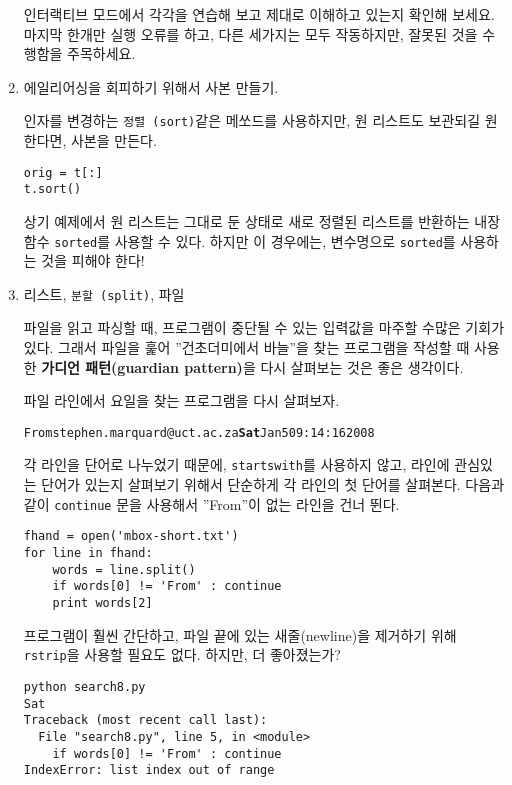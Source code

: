 \begin{enumerate}
인터랙티브 모드에서 각각을 연습해 보고 제대로 이해하고 있는지 확인해 보세요.
마지막 한개만 실행 오류를 하고, 다른 세가지는 모두 작동하지만, 잘못된 것을 수행함을 주목하세요.

\item 에일리어싱을 회피하기 위해서 사본 만들기.


인자를 변경하는 {\tt 정렬 (sort)}같은 메쏘드를 사용하지만, 원 리스트도 보관되길 원한다면, 사본을 만든다.

\beforeverb
\begin{verbatim}
orig = t[:]
t.sort()
\end{verbatim}
\afterverb

상기 예제에서 원 리스트는 그대로 둔 상태로 새로 정렬된 리스트를 반환하는 내장함수 {\tt sorted}를 사용할 수 있다.
하지만 이 경우에는, 변수명으로 {\tt sorted}를 사용하는 것을 피해야 한다!


\item 리스트, {\tt 분할 (split)}, 파일

파일을 읽고 파싱할 때, 프로그램이 중단될 수 있는 입력값을 마주할 수많은 기회가 있다.
그래서 파일을 훑어 ''건초더미에서 바늘''을 찾는 프로그램을 작성할 때 사용한 {\bf 가디언 패턴(guardian pattern)}을 다시 살펴보는 것은 좋은 생각이다.

파일 라인에서 요일을 찾는 프로그램을 다시 살펴보자.

\beforeverb
\begin{alltt}
From stephen.marquard@uct.ac.za {\bf Sat} Jan  5 09:14:16 2008
\end{alltt}
\afterverb

각 라인을 단어로 나누었기 때문에, {\tt startswith}를 사용하지 않고, 라인에 관심있는 단어가 있는지 살펴보기 위해서 단순하게 각 라인의 첫 단어를 살펴본다.
다음과 같이 {\tt continue} 문을 사용해서 ''From''이 없는 라인을 건너 뛴다. 

\beforeverb
\begin{verbatim}
fhand = open('mbox-short.txt')
for line in fhand:
    words = line.split()
    if words[0] != 'From' : continue
    print words[2]
\end{verbatim}
\afterverb
%

프로그램이 훨씬 간단하고, 파일 끝에 있는 새줄(newline)을 제거하기 위해 {\tt rstrip}을 사용할 필요도 없다.
하지만, 더 좋아졌는가?

\beforeverb
\begin{verbatim}
python search8.py 
Sat
Traceback (most recent call last):
  File "search8.py", line 5, in <module>
    if words[0] != 'From' : continue
IndexError: list index out of range
\end{verbatim}
\afterverb
%


\end{enumerate}
